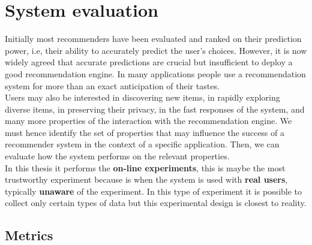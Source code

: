 \chapter{System evaluation} \label{evaluation}

Initially most recommenders have been evaluated and ranked on their
prediction power, i.e, their ability to accurately predict the user's
choices. However, it is now widely agreed that accurate predictions
are crucial but insufficient to deploy a good recommendation engine.
In many applications people use a recommendation system for more than
an exact anticipation of their tastes.\\ Users may also be interested
in discovering new items, in rapidly exploring diverse items, in
preserving their privacy, in the fast responses of the system, and
many more properties of the interaction with the recommendation
engine. We must hence identify the set of properties that may
influence the success of a recommender system in the context of a
specific application. Then, we can evaluate how the system performs on
the relevant properties\cite{adomavicius2011context}.\\ 
In this thesis it performs the \textbf{on-line experiments}, 
this is maybe the most trustworthy experiment because is when 
the system is  used with \textbf{real users}, typically 
\textbf{unaware} of the experiment. In
this type of experiment it is possible to collect only certain types
of data but this experimental design is closest to reality.

\section{Metrics}

